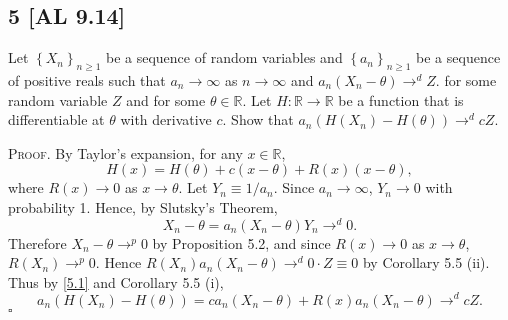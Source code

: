\documentclass[12pt]{article}
\newcounter{ProofCounter}
\newenvironment{Proof}{\stepcounter{ProofCounter}\textsc{Proof.}}{\hfill$\square$}
\begin{document}
\subsection*{5 [AL 9.14]}
\begin{tcolorbox}
Let $\left\{ X_{n} \right\}_{n\geq 1}$ be a sequence of random variables and $\left\{ a_n \right\}_{n\geq 1}$ be a sequence of positive reals such
that $a_n \rightarrow \infty$ as $n \rightarrow \infty$ and $a_n(X_n - \theta) \rightarrow^{d} Z$.
for some random variable $Z$ and for some $\theta \in \mathbb{R}$. Let $H : \mathbb{R} \rightarrow \mathbb{R}$ be a function that is differentiable at
$\theta$ with derivative $c$. Show that 
$a_n(H(X_n) - H(\theta)) \rightarrow^{d} cZ$. 
\end{tcolorbox}
\begin{Proof}
By Taylor's expansion, for any $x \in \mathbb{R}$,
\begin{equation}
H(x) = H(\theta) + c(x - \theta) + R(x)(x - \theta), 
\label{5.1}
\end{equation}
where $R(x) \rightarrow 0$ as $x \rightarrow \theta$.
Let $Y_n \equiv 1 / a_n$. Since $a_n \rightarrow \infty$, $Y_n \rightarrow 0$ with probability 1. Hence, by Slutsky's Theorem, 
\[ X_n - \theta = a_n(X_n - \theta)Y_n \rightarrow^{d} 0. \]
Therefore $X_n - \theta \rightarrow^{p} 0$ by Proposition 5.2, and since $R(x) \rightarrow 0$ as $x \rightarrow \theta$, $R(X_n) \rightarrow^{p} 0$.
Hence $R(X_n)a_n(X_n - \theta) \rightarrow^{d} 0\cdot Z \equiv 0$ by Corollary 5.5 (ii). Thus by \eqref{5.1} and Corollary 5.5 (i),
\[ a_n(H(X_n) - H(\theta)) = ca_n(X_n - \theta) + R(x)a_n(X_n - \theta) \rightarrow^{d} cZ. \]
\end{Proof}
\end{document}
